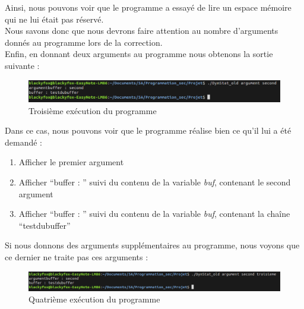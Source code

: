 Ainsi, nous pouvons voir que le programme a essayé de lire un espace mémoire qui ne lui était pas réservé.\\
Nous savons donc que nous devrons faire attention au nombre d'arguments donnés au programme lors de la correction.\\
Enfin, en donnant deux arguments au programme nous obtenons la sortie suivante :
\begin{figure}[H]
  \centering
  \includegraphics[width=.9\textwidth]{img/exe3.png}
  \caption{Troisième exécution du programme}
  \label{img:6}
\end{figure}
Dans ce cas, nous pouvons voir que le programme réalise bien ce qu'il lui a été demandé :
\begin{enumerate}
 \item Afficher le premier argument
 \item Afficher \enquote{buffer : } suivi du contenu de la variable \textit{buf}, contenant le second argument
 \item Afficher \enquote{buffer : } suivi du contenu de la variable \textit{buf}, contenant la chaîne \enquote{testdubuffer}
\end{enumerate}
Si nous donnons des arguments supplémentaires au programme, nous voyons que ce dernier ne traite pas ces arguments :
\begin{figure}[H]
  \centering
  \includegraphics[width=.9\textwidth]{img/exe4.png}
  \caption{Quatrième exécution du programme}
  \label{img:7}
\end{figure}
